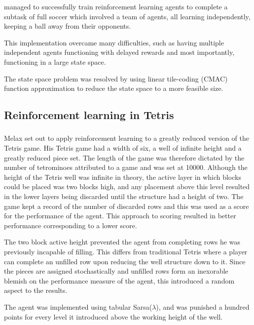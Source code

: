 \documentclass{rucsthesis}
\begin{document}
\cite{keepaway} managed to successfully train reinforcement learning agents to complete a subtask of full soccer which involved a team of agents, all learning independently, keeping a ball away from their opponents. 

This implementation overcame many difficulties, such as having multiple independent agents functioning with delayed rewards and most importantly, functioning in a large state space. 

The state space problem was resolved by using linear tile-coding (CMAC) function approximation to reduce the state space to a more feasible size\citep{keepaway}.

\subsection{Reinforcement learning in Tetris}

\subsubsection{\cite{melaxtetris}}

Melax set out to apply reinforcement learning to a greatly reduced version of the Tetris game. His Tetris game had a width of six, a well of infinite height and a greatly reduced piece set. The length of the game was therefore dictated by the number of tetrominoes attributed to a game and was set at 10000. Although the height of the Tetris well was infinite in theory, the active layer in which blocks could be placed was two blocks high, and any placement above this level resulted in the lower layers being discarded until the structure had a height of two. The game kept a record of the number of discarded rows and this was used as a score for the performance of the agent. This approach to scoring resulted in better performance corresponding to a lower score. 

The two block active height prevented the agent from completing rows he was previously incapable of filling. This differs from traditional Tetris where a player can complete an unfilled row upon reducing the well structure down to it. Since the pieces are assigned stochastically and unfilled rows form an inexorable blemish on the performance measure of the agent, this introduced a random aspect to the results.

The agent was implemented using tabular Sarsa($\lambda$), and was punished a hundred points for every level it introduced above the working height of the well.
\end{document}
